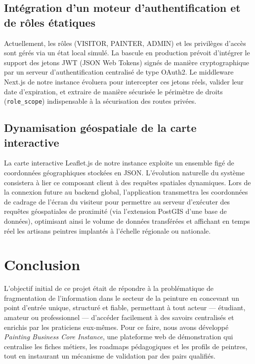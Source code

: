 \documentclass[12pt,a4paper]{report}
\begin{document}
\subsection{Intégration d'un moteur d'authentification et de rôles étatiques}

Actuellement, les rôles (VISITOR, PAINTER, ADMIN) et les privilèges d'accès sont gérés via un état local simulé. La bascule en production prévoit d'intégrer le support des jetons JWT (JSON Web Tokens) signés de manière cryptographique par un serveur d'authentification centralisé de type OAuth2. Le middleware Next.js de notre instance évoluera pour intercepter ces jetons réels, valider leur date d'expiration, et extraire de manière sécurisée le périmètre de droits (\texttt{role\_scope}) indispensable à la sécurisation des routes privées.

\subsection{Dynamisation géospatiale de la carte interactive}

La carte interactive Leaflet.js de notre instance exploite un ensemble figé de coordonnées géographiques stockées en JSON. L'évolution naturelle du système consistera à lier ce composant client à des requêtes spatiales dynamiques. Lors de la connexion future au backend global, l'application transmettra les coordonnées de cadrage de l'écran du visiteur pour permettre au serveur d'exécuter des requêtes géospatiales de proximité (via l'extension PostGIS d'une base de données), optimisant ainsi le volume de données transférées et affichant en temps réel les artisans peintres implantés à l'échelle régionale ou nationale.

\newpage
\section{Conclusion}

L'objectif initial de ce projet était de répondre à la problématique de fragmentation de l'information dans le secteur de la peinture en concevant un point d'entrée unique, structuré et fiable, permettant à tout acteur — étudiant, amateur ou professionnel — d'accéder facilement à des savoirs centralisés et enrichis par les praticiens eux-mêmes. Pour ce faire, nous avons développé \textit{Painting Business Core Instance}, une plateforme web de démonstration qui centralise les fiches métiers, les roadmaps pédagogiques et les profils de peintres, tout en instaurant un mécanisme de validation par des pairs qualifiés.
\end{document}
